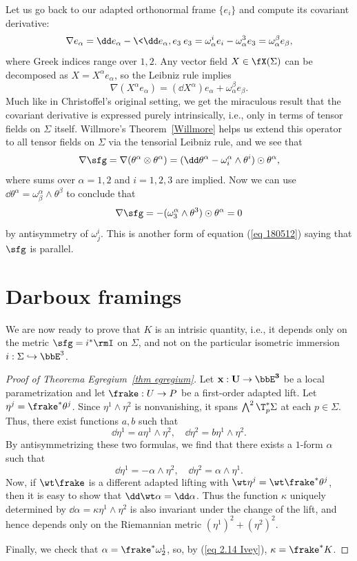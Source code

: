 \begin{rem}
    Let us go back to our adapted orthonormal frame $\{e_i\}$ and compute its covariant derivative:
    \[\nabla e_\alpha=\dd e_\alpha-\<\dd e_\alpha,e_3\>e_3=\omega^i_\alpha e_i-\omega^3_\alpha e_3=\omega^\beta_\alpha e_\beta,\]
    where Greek indices range over $1,2$. Any vector field $X\in\fX(\Sigma)$ can be decomposed as $X=X^\alpha e_\alpha$, so the Leibniz rule implies 
    \[\nabla(X^\alpha e_\alpha)=(\dd X^\alpha)e_\alpha+\omega^\beta_\alpha e_\beta.\]
    Much like in Christoffel's original setting, we get the miraculous result that the covariant derivative is expressed purely intrinsically, i.e., only in terms of tensor fields on $\Sigma$ itself.
    Willmore's Theorem~\ref{Willmore} helps us extend this operator to all tensor fields on $\Sigma$ via the tensorial Leibniz rule, and we see that
    \[\nabla\sfg=\nabla(\theta^\alpha\otimes \theta^\alpha)=(\dd \theta^\alpha-\omega^\alpha_i\wedge \theta^i)\odot \theta^\alpha,\]
    where sums over $\alpha=1,2$ and $i=1,2,3$ are implied. Now we can use $\dd\theta^\alpha=\omega^\alpha_\beta\wedge\theta^\beta$ to conclude that 
    \[\nabla\sfg=-(\omega^\alpha_3\wedge\theta^3)\odot \theta^\alpha=0\]
    by antisymmetry of $\omega^i_j$. This is another form of equation (\ref{eq 180512}) saying that $\sfg$ is parallel.
\end{rem}








\section{Darboux framings}\label{sec: principal framings}

We are now ready to prove that $K$ is an intrisic quantity, i.e., it depends only on the metric $\sfg=i^\ast\rmI$ on $\Sigma$, and not on the particular isometric immersion $i:\Sigma\hookrightarrow \bbE^3$.

\begin{proof}[Proof of Theorema Egregium~\ref{thm egregium}]
    Let $\bf{x}:U\to \bbE^3$ be a local parametrization and let $\frake:U\to P$ be a first-order adapted lift. Let $\eta^j=\frake^\ast\theta^j$. Since $\eta^1\wedge\eta^2$ is nonvanishing, it spans $\bigwedge^2 \T_p^\ast\Sigma$ at each $p\in\Sigma$. Thus, there exist functions $a,b$ such that 
    \[\dd\eta^1=a\eta^1\wedge\eta^2,\quad \dd\eta^2=b\eta^1\wedge \eta^2.\]
    By antisymmetrizing these two formulas, we find that there exists a $1$-form $\alpha$ such that 
    \[\dd\eta^1=-\alpha\wedge\eta^2,\quad \dd\eta^2=\alpha\wedge\eta^1.\]
    Now, if $\wt\frake$ is a different adapted lifting with $\wt\eta^j=\wt\frake^\ast\theta^j$, then it is easy to show that $\dd\wt\alpha=\dd\alpha$. Thus the function $\kappa$ uniquely determined by $\dd\alpha=\kappa\eta^1\wedge\eta^2$ is also invariant under the change of the lift, and hence depends only on the Riemannian metric $(\eta^1)^2+(\eta^2)^2$.

    Finally, we check that $\alpha=\frake^\ast\omega_2^1$, so, by (\ref{eq 2.14 Ivey}), $\kappa=\frake^\ast K$.
\end{proof}

